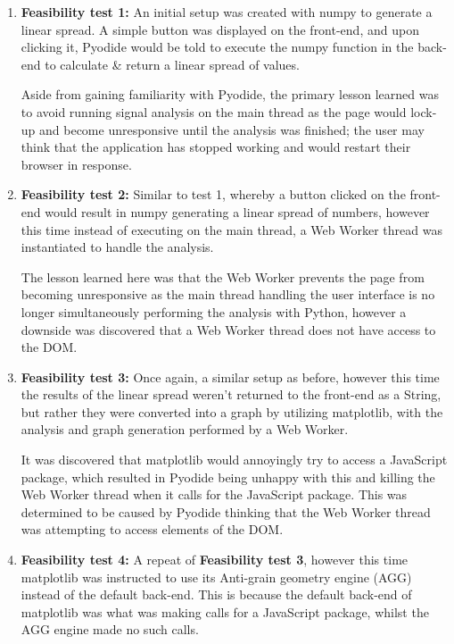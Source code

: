 \begin{enumerate}
    \item {\bf Feasibility test 1:} An initial setup was created with numpy to generate a linear spread. A simple button was displayed on the front-end, and upon clicking it, Pyodide would be told to execute the numpy function in the back-end to calculate \& return a linear spread of values.
    
    Aside from gaining familiarity with Pyodide, the primary lesson learned was to avoid running signal analysis on the main thread as the page would lock-up and become unresponsive until the analysis was finished; the user may think that the application has stopped working and would restart their browser in response. 
    
    \item {\bf Feasibility test 2:} Similar to test 1, whereby a button clicked on the front-end would result in numpy generating a linear spread of numbers, however this time instead of executing on the main thread, a Web Worker thread was instantiated to handle the analysis.
    
    The lesson learned here was that the Web Worker prevents the page from becoming unresponsive as the main thread handling the user interface is no longer simultaneously performing the analysis with Python, however a downside was discovered that a Web Worker thread does not have access to the DOM. 
    
    \item {\bf Feasibility test 3:} Once again, a similar setup as before, however this time the results of the linear spread weren't returned to the front-end as a String, but rather they were converted into a graph by utilizing matplotlib, with the analysis and graph generation performed by a Web Worker. 
    
    It was discovered that matplotlib would annoyingly try to access a JavaScript package, which resulted in Pyodide being unhappy with this and killing the Web Worker thread when it calls for the JavaScript package. This was determined to be caused by Pyodide thinking that the Web Worker thread was attempting to access elements of the DOM. 
    
    \item {\bf Feasibility test 4:} A repeat of {\bf Feasibility test 3}, however this time matplotlib was instructed to use its Anti-grain geometry engine (AGG) instead of the default back-end. This is because the default back-end of matplotlib was what was making calls for a JavaScript package, whilst the AGG engine made no such calls.
    

\end{enumerate}
